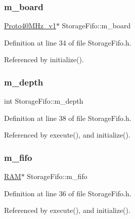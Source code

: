 \subsubsection{\texorpdfstring{m\+\_\+board}{m\_board}}
{\footnotesize\ttfamily \hyperlink{classProto40MHz__v1}{Proto40\+M\+Hz\+\_\+v1}$\ast$ Storage\+Fifo\+::m\+\_\+board\hspace{0.3cm}{\ttfamily [private]}}



Definition at line 34 of file Storage\+Fifo.\+h.



Referenced by initialize().

\mbox{\label{classStorageFifo_a4312878a2a96e6a306be9e5fd99064d5}} 
\subsubsection{\texorpdfstring{m\+\_\+depth}{m\_depth}}
{\footnotesize\ttfamily int Storage\+Fifo\+::m\+\_\+depth\hspace{0.3cm}{\ttfamily [private]}}



Definition at line 38 of file Storage\+Fifo.\+h.



Referenced by execute(), and initialize().

\mbox{\label{classStorageFifo_a4b1f3eb44df4f2d46a8a62189d662390}} 
\subsubsection{\texorpdfstring{m\+\_\+fifo}{m\_fifo}}
{\footnotesize\ttfamily \hyperlink{classRAM}{R\+AM}$\ast$ Storage\+Fifo\+::m\+\_\+fifo\hspace{0.3cm}{\ttfamily [private]}}



Definition at line 36 of file Storage\+Fifo.\+h.



Referenced by execute(), and initialize().

\mbox{\label{classStorageFifo_abe762844e442bc8188643b18b276d801}} 
